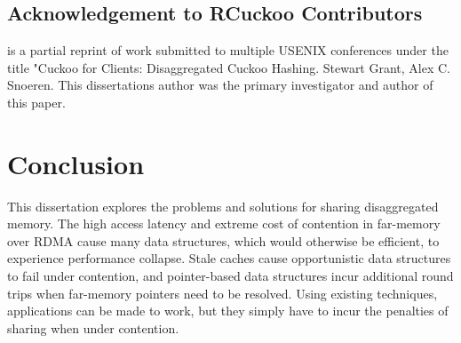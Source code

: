 \documentclass[12pt]{ucsddissertation}
\newcommand{\sword}{SwordBox}
\begin{document}
\section{Acknowledgement to RCuckoo Contributors}

is a partial reprint of work submitted to multiple USENIX conferences
under the title "Cuckoo for Clients: Disaggregated Cuckoo Hashing. Stewart Grant, Alex C. Snoeren.
This dissertations author was the primary investigator and author of this paper.



\chapter{Conclusion}

This dissertation explores the problems and solutions for sharing disaggregated memory. The high
access latency and extreme cost of contention in far-memory over RDMA cause many data structures,
which would otherwise be efficient, to experience performance collapse. Stale caches cause
opportunistic data structures to fail under contention, and pointer-based data structures incur
additional round trips when far-memory pointers need to be resolved. Using existing techniques,
applications can be made to work, but they simply have to incur the penalties of sharing when under
contention.

\end{document}
